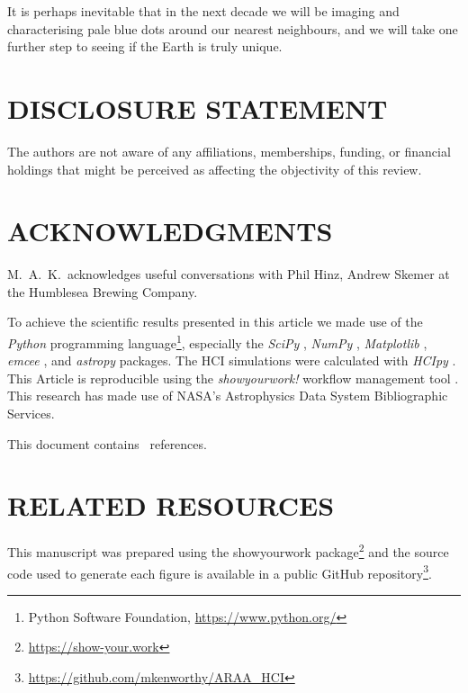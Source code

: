 \documentclass[letterpaper]{ar-1col}
\newcommand{\project}[1]{\textsf{#1}}
\begin{document}
It is perhaps inevitable that in the next decade we will be imaging and characterising pale blue dots around our nearest neighbours, and we will take one further step to seeing if the Earth is truly unique.

\section*{DISCLOSURE STATEMENT}
The authors are not aware of any affiliations, memberships, funding, or financial holdings that
might be perceived as affecting the objectivity of this review.

\section*{ACKNOWLEDGMENTS}
M.\ A.\ K.\ acknowledges useful conversations with
Phil Hinz, Andrew Skemer at the Humblesea Brewing Company.

To achieve the scientific results presented in this article we made use of the \emph{Python} programming language\footnote{Python Software Foundation, \url{https://www.python.org/}}, especially the \emph{SciPy} \citep{virtanen2020}, \emph{NumPy} \citep{numpy}, \emph{Matplotlib} \citep{Matplotlib}, \emph{emcee} \citep{foreman-mackey2013}, and \emph{astropy} \citep{astropy_1,astropy_2} packages.
%
The HCI simulations were calculated with \emph{HCIpy} \citep{Por18}.
%
This Article is reproducible using the \emph{showyourwork!} workflow management tool \citep{Luger2021}.
%
This research has made use of NASA's Astrophysics Data System Bibliographic Services.

This document contains \ references.





\section*{RELATED RESOURCES}

This manuscript was prepared using the \project{showyourwork} package\footnote{\url{https://show-your.work}} and the source code used to generate each figure is available in a public \project{GitHub} repository\footnote{\url{https://github.com/mkenworthy/ARAA_HCI}}.
\end{document}
